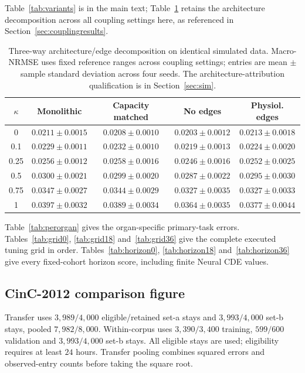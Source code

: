 Table~\ref{tab:variants} is in the main text; Table~\ref{tab:decomposition} retains the architecture decomposition across all coupling settings here, as referenced in Section~\ref{sec:couplingresults}.
\begin{table}[tbp]
\centering
\caption{Three-way architecture/edge decomposition on identical simulated data. Macro-NRMSE uses fixed reference ranges across coupling settings; entries are mean $\pm$ sample standard deviation across four seeds. The architecture-attribution qualification is in Section~\ref{sec:sim}.}\label{tab:decomposition}
\small\setlength{\tabcolsep}{4pt}
\begin{tabular}{ccccc}
\toprule
$\kappa$ 
& Monolithic 
& Capacity matched 
& No edges 
& Physiol. edges 
\\
\midrule
0 
& $0.0211\pm0.0015$ 
& $0.0208\pm0.0010$ 
& $0.0203\pm0.0012$ 
& $0.0213\pm0.0018$ 
\\
0.1 
& $0.0229\pm0.0011$ 
& $0.0232\pm0.0010$ 
& $0.0219\pm0.0013$ 
& $0.0224\pm0.0020$ 
\\
0.25 
& $0.0256\pm0.0012$ 
& $0.0258\pm0.0016$ 
& $0.0246\pm0.0016$ 
& $0.0252\pm0.0025$ 
\\
0.5 
& $0.0300\pm0.0021$ 
& $0.0299\pm0.0020$ 
& $0.0287\pm0.0022$ 
& $0.0295\pm0.0030$ 
\\
0.75 
& $0.0347\pm0.0027$ 
& $0.0344\pm0.0029$ 
& $0.0327\pm0.0035$ 
& $0.0327\pm0.0033$ 
\\
1 
& $0.0397\pm0.0032$ 
& $0.0389\pm0.0034$ 
& $0.0364\pm0.0035$ 
& $0.0377\pm0.0044$ 
\\
\bottomrule
\end{tabular}
\end{table}


Table~\ref{tab:perorgan} gives the organ-specific primary-task errors.
Tables~\ref{tab:grid0}, \ref{tab:grid18} and~\ref{tab:grid36} give the complete executed tuning grid in order.
Tables~\ref{tab:horizon0}, \ref{tab:horizon18} and~\ref{tab:horizon36} give every fixed-cohort horizon score, including finite Neural CDE values.


\subsection{CinC-2012 comparison figure}
Transfer uses $3{,}989/4{,}000$ eligible/retained set-a stays and $3{,}993/4{,}000$ set-b stays, pooled $7{,}982/8{,}000$. Within-corpus uses $3{,}390/3{,}400$ training, $599/600$ validation and $3{,}993/4{,}000$ set-b stays. All eligible stays are used; eligibility requires at least $24$ hours. Transfer pooling combines squared errors and observed-entry counts before taking the square root.

